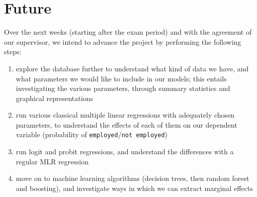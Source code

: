 \section{Future} Over the next weeks (starting after the exam period) and with the agreement of our
supervisor, we intend to advance the project by performing the following steps:
\begin{enumerate}
    \item explore the database further to understand what kind of data we have, and what parameters
we would like to include in our models; this entails investigating the various parameters, through
summary statistics and graphical representations
    \item run various classical multiple linear regressions with adequately chosen parameters, to
understand the effects of each of them on our dependent variable (probability of
\texttt{employed}/\texttt{not employed})
    \item run logit and probit regressions, and understand the differences with a regular MLR
regression
    \item move on to machine learning algorithms (decision trees, then random forest and boosting),
and investigate ways in which we can extract marginal effects \end{enumerate}
